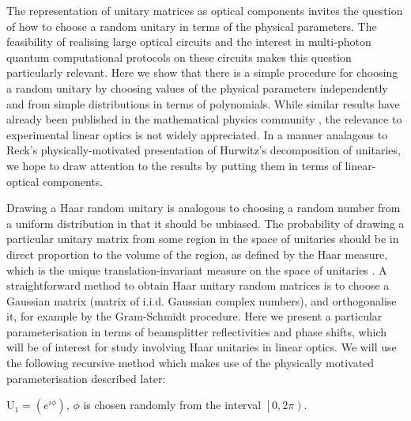 \documentclass[aps,prl,twocolumn]{revtex4}
\newcommand{\mat}[1]{\mathrm{#1}}
\begin{document}
The representation of unitary matrices as optical components invites the
question of how to choose a random unitary in terms of the physical parameters. 
The feasibility of realising large optical circuits and the interest in
multi-photon quantum computational protocols on these circuits makes this
question particularly relevant. Here we show that there is a simple procedure
for choosing a random unitary by choosing values of the physical parameters
independently and from simple distributions in terms of polynomials. While
similar results have already been published in the mathematical physics
community \cite{sp-jmp-53-013501, zy-jpa-27-4235}, the relevance to experimental
linear optics is not widely appreciated. In a manner analagous to Reck's
physically-motivated presentation of Hurwitz's decomposition of unitaries, we
hope to draw attention to the results by putting them in terms of linear-optical
components.


Drawing a Haar random unitary is analogous to choosing a random number from a
uniform distribution in that it should be unbiased. The probability of drawing
a particular unitary matrix from some region in the space of unitaries should
be in direct proportion to the volume of the region, as defined by the Haar
measure, which is the unique translation-invariant measure on the space of
unitaries \cite{re-phd}.  A straightforward method to obtain Haar unitary random
matrices is to choose a Gaussian matrix (matrix of i.i.d. Gaussian complex
numbers), and orthogonalise it\cite{re-phd}, for example by the Gram-Schmidt
procedure.  Here
we present a particular parameterisation in terms of beamsplitter reflectivities
and phase shifts, which will be of interest for study involving Haar unitaries
in linear optics. We will use the following recursive method which makes use of
the physically motivated parameterisation described later:

\(\mat{U}_1 = \left( e^{i \phi} \right)\), \(\phi\) is chosen randomly from the
interval \( \left[ 0, 2\pi \right) \).
\end{document}
